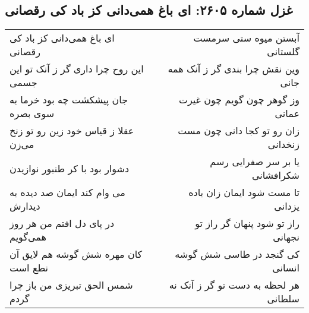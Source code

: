 \begin{center}
\section*{غزل شماره ۲۶۰۵: ای باغ همی‌دانی کز باد کی رقصانی}
\label{sec:2605}
\begin{longtable}{l p{0.5cm} r}
ای باغ همی‌دانی کز باد کی رقصانی
&&
آبستن میوه ستی سرمست گلستانی
\\
این روح چرا داری گر ز آنک تو این جسمی
&&
وین نقش چرا بندی گر ز آنک همه جانی
\\
جان پیشکشت چه بود خرما به سوی بصره
&&
وز گوهر چون گویم چون غیرت عمانی
\\
عقلا ز قیاس خود زین رو تو زنخ می‌زن
&&
زان رو تو کجا دانی چون مست زنخدانی
\\
دشوار بود با کر طنبور نوازیدن
&&
یا بر سر صفرایی رسم شکرافشانی
\\
می وام کند ایمان صد دیده به دیدارش
&&
تا مست شود ایمان زان باده یزدانی
\\
در پای دل افتم من هر روز همی‌گویم
&&
راز تو شود پنهان گر راز تو نجهانی
\\
کان مهره شش گوشه هم لایق آن نطع است
&&
کی گنجد در طاسی شش گوشه انسانی
\\
شمس الحق تبریزی من باز چرا گردم
&&
هر لحظه به دست تو گر ز آنک نه سلطانی
\\
\end{longtable}
\end{center}
